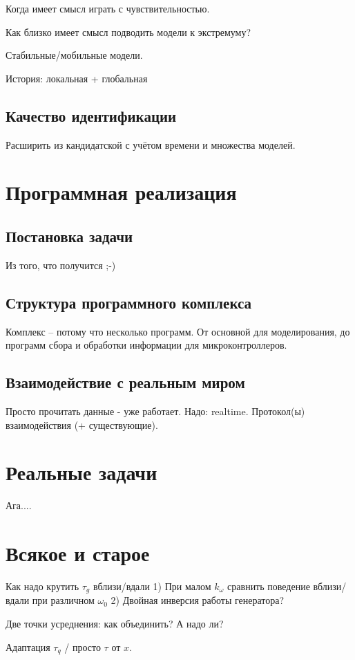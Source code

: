 \documentclass[a4paper,12pt]{article}
\begin{document}
Когда имеет смысл играть с чувствительностью.

Как близко имеет смысл подводить модели к экстремуму?


Стабильные/мобильные модели.

История: локальная + глобальная

\subsection{Качество идентификации}

Расширить из кандидатской с учётом времени и множества моделей.



\section{Программная реализация}

\subsection{Постановка задачи}

Из того, что получится ;-)

\subsection{Структура программного комплекса}

Комплекс -- потому что несколько программ.
От основной для моделирования, до программ сбора и обработки
информации для микроконтроллеров.

\subsection{Взаимодействие с реальным миром}

Просто прочитать данные - уже работает.
Надо: realtime.
Протокол(ы) взаимодействия (+ существующие).


\section{Реальные задачи}

Ага....


\section{Всякое и старое}



Как надо крутить $\tau_g$ вблизи/вдали
 1) При малом $k_\omega$ сравнить поведение вблизи/вдали при различном $\omega_0$
 2) Двойная инверсия работы генератора?

Две точки усреднения: как объединить? А надо ли?

Адаптация $\tau_q$ / просто $\tau$ от $x$.
\end{document}
